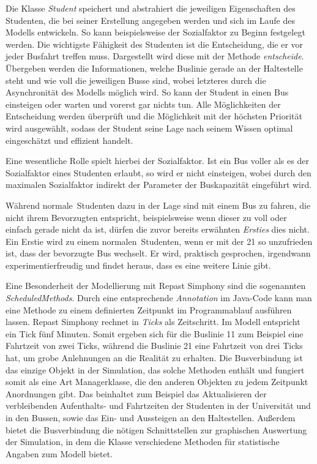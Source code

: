 \documentclass[12pt,a4paper]{scrartcl}
\begin{document}
Die Klasse \textit{Student} speichert und abstrahiert die jeweiligen Eigenschaften des Studenten, die bei seiner Erstellung angegeben werden und sich im Laufe des Modells entwickeln. So kann beispielsweise der Sozialfaktor zu Beginn festgelegt werden. Die wichtigste Fähigkeit des Studenten ist die Entscheidung, die er vor jeder Busfahrt treffen muss. Dargestellt wird diese mit der Methode \textit{entscheide}. Übergeben werden die Informationen, welche Buslinie gerade an der Haltestelle steht und wie voll die jeweiligen Busse sind, wobei letzteres durch die Asynchronität des Modells möglich wird. So kann der Student in einen Bus einsteigen oder warten und vorerst gar nichts tun. Alle Möglichkeiten der Entscheidung werden überprüft und die Möglichkeit mit der höchsten Priorität wird ausgewählt, sodass der Student seine Lage nach seinem Wissen optimal eingeschätzt und effizient handelt. 

Eine wesentliche Rolle spielt hierbei der Sozialfaktor. Ist ein Bus voller als es der Sozialfaktor eines Studenten erlaubt, so wird er nicht einsteigen, wobei durch den maximalen Sozialfaktor indirekt der Parameter der Buskapazität eingeführt wird.

Während \glqq normale\grqq~Studenten dazu in der Lage sind mit einem Bus zu fahren, die nicht ihrem Bevorzugten entspricht, beispielsweise wenn dieser zu voll oder einfach gerade nicht da ist, dürfen die zuvor bereits erwähnten \textit{Ersties} dies nicht. Ein Erstie wird zu einem \glqq normalen\grqq~Studenten, wenn er mit der 21 so unzufrieden ist, dass der bevorzugte Bus wechselt. Er wird, praktisch gesprochen, irgendwann experimentierfreudig und findet heraus, dass es eine weitere Linie gibt.

Eine Besonderheit der Modellierung mit Repast Simphony sind die sogenannten \textit{ScheduledMethods}. Durch eine entsprechende \textit{Annotation} im Java-Code kann man eine Methode zu einem definierten Zeitpunkt im Programmablauf ausführen lassen. Repast Simphony rechnet in \textit{Ticks} als Zeitschritt. Im Modell entspricht ein Tick fünf Minuten. Somit ergeben sich für die Buslinie 11 zum Beispiel eine Fahrtzeit von zwei Ticks, während die Buslinie 21 eine Fahrtzeit von drei Ticks hat, um grobe Anlehnungen an die Realität zu erhalten. Die Busverbindung ist das einzige Objekt in der Simulation, das solche Methoden enthält und fungiert somit als eine Art Managerklasse, die den anderen Objekten zu jedem Zeitpunkt Anordnungen gibt. Das beinhaltet zum Beispiel das Aktualisieren der verbleibenden Aufenthalts- und Fahrtzeiten der Studenten in der Universität und in den Bussen, sowie das Ein- und Aussteigen an den Haltestellen. Außerdem bietet die Busverbindung die nötigen Schnittstellen zur graphischen Auswertung der Simulation, in dem die Klasse verschiedene Methoden für statistische Angaben zum Modell bietet. 
\end{document}
